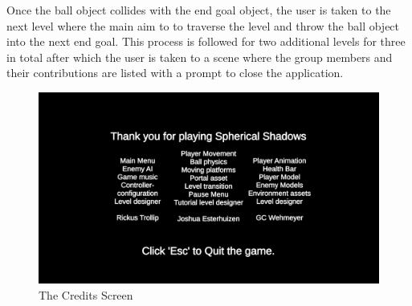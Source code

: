\noindent Once the ball object collides with the end goal object, the user is taken to the next level where the main aim to to traverse the level and throw the ball object into the next end goal. This process is followed for two additional levels for three in total  after which the user is taken to a scene where the group members and their contributions are listed with a prompt to close the application.

\begin{figure}[H]
\centering
\centerline{\includegraphics[scale=0.33]{Figures/credits.png}}
\caption{The Credits Screen}
\end{figure}

